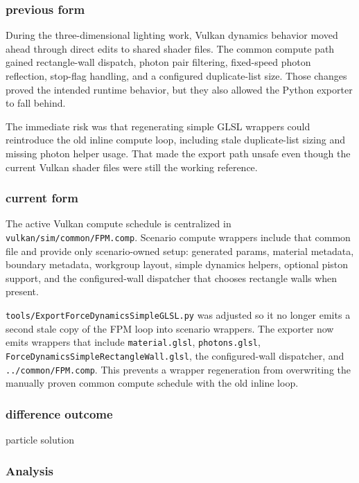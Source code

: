 \subsubsection{previous form}

During the three-dimensional lighting work, Vulkan dynamics behavior moved
ahead through direct edits to shared shader files.  The common compute path
gained rectangle-wall dispatch, photon pair filtering, fixed-speed photon
reflection, stop-flag handling, and a configured duplicate-list size.  Those
changes proved the intended runtime behavior, but they also allowed the Python
exporter to fall behind.

The immediate risk was that regenerating simple GLSL wrappers could reintroduce
the old inline compute loop, including stale duplicate-list sizing and missing
photon helper usage.  That made the export path unsafe even though the current
Vulkan shader files were still the working reference.

\subsubsection{current form}

The active Vulkan compute schedule is centralized in
\texttt{vulkan/sim/common/FPM.comp}.  Scenario compute wrappers include that
common file and provide only scenario-owned setup: generated params, material
metadata, boundary metadata, workgroup layout, simple dynamics helpers, optional
piston support, and the configured-wall dispatcher that chooses rectangle walls
when present.

\texttt{tools/ExportForceDynamicsSimpleGLSL.py} was adjusted so it no longer
emits a second stale copy of the FPM loop into scenario wrappers.  The exporter
now emits wrappers that include \texttt{material.glsl},
\texttt{photons.glsl}, \texttt{ForceDynamicsSimpleRectangleWall.glsl}, the
configured-wall dispatcher, and \texttt{../common/FPM.comp}.  This prevents a
wrapper regeneration from overwriting the manually proven common compute
schedule with the old inline loop.

\subsubsection{difference outcome}

particle solution

\subsubsection{Analysis}

